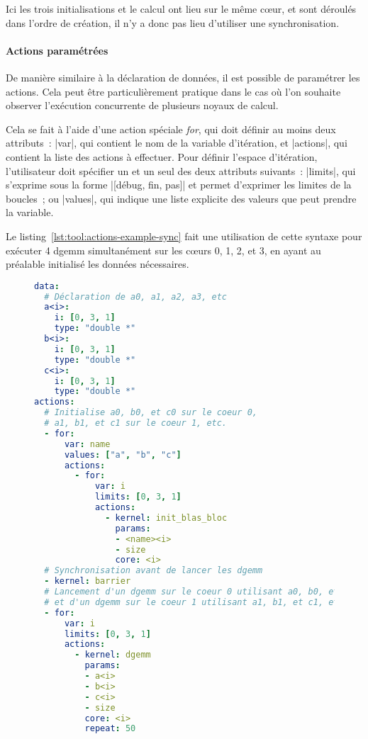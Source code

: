 Ici les trois initialisations et le calcul ont lieu sur le même cœur, et sont déroulés dans l'ordre de création, il n'y a donc pas lieu d'utiliser une synchronisation.

\paragraph{Actions paramétrées}

De manière similaire à la déclaration de données, il est possible de paramétrer les actions.
Cela peut être particulièrement pratique dans le cas où l'on souhaite observer l'exécution concurrente de plusieurs noyaux de calcul.

Cela se fait à l'aide d'une action spéciale \emph{for}, qui doit définir au moins deux attributs~: |var|, qui contient le nom de la variable d'itération, et |actions|, qui contient la liste des actions à effectuer.
Pour définir l'espace d'itération, l'utilisateur doit spécifier un et un seul des deux attributs suivants~: |limits|, qui s'exprime sous la forme |[débug, fin, pas]| et permet d'exprimer les limites de la boucles~; ou |values|, qui indique une liste explicite des valeurs que peut prendre la variable.

Le listing~\ref{lst:tool:actions-example-sync} fait une utilisation de cette syntaxe pour exécuter 4 dgemm simultanément sur les cœurs 0, 1, 2, et 3, en ayant au préalable initialisé les données nécessaires.

\begin{figure}[h!]
\begin{lstlisting}[language=yaml,caption=Exemple de déclaration d'actions synchronisées,label=lst:tool:actions-example-sync]
data:
  # Déclaration de a0, a1, a2, a3, etc
  a<i>:
    i: [0, 3, 1]
    type: "double *"
  b<i>:
    i: [0, 3, 1]
    type: "double *"
  c<i>:
    i: [0, 3, 1]
    type: "double *"
actions:
  # Initialise a0, b0, et c0 sur le coeur 0,
  # a1, b1, et c1 sur le coeur 1, etc.
  - for:
      var: name
      values: ["a", "b", "c"]
      actions:
        - for:
            var: i
            limits: [0, 3, 1]
            actions:
              - kernel: init_blas_bloc
                params:
                - <name><i>
                - size
                core: <i>
  # Synchronisation avant de lancer les dgemm
  - kernel: barrier
  # Lancement d'un dgemm sur le coeur 0 utilisant a0, b0, et c0,
  # et d'un dgemm sur le coeur 1 utilisant a1, b1, et c1, etc.
  - for:
      var: i
      limits: [0, 3, 1]
      actions:
        - kernel: dgemm
          params:
          - a<i>
          - b<i>
          - c<i>
          - size
          core: <i>
          repeat: 50
\end{lstlisting}
\end{figure}

